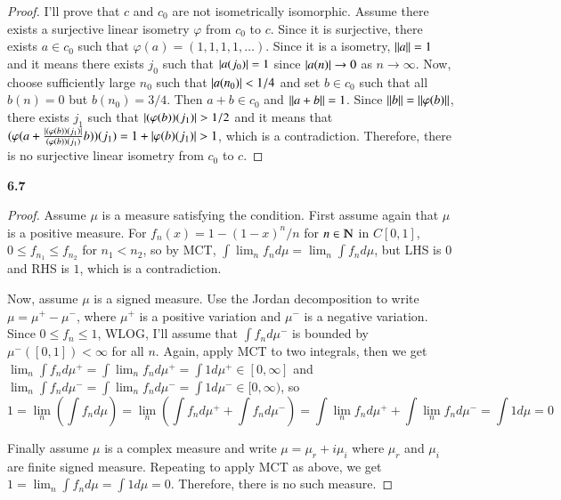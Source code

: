 \documentclass[a4paper, 12pt]{article}
\theoremstyle{Mydefinition}
\theoremstyle{Mytheorem}
\begin{document}
\begin{proof}
I'll prove that $c$ and $c_0$ are not isometrically isomorphic. Assume there exists a surjective linear isometry $\varphi$ from $c_0$ to $c$. Since it is surjective, there exists $a\in c_0$ such that $\varphi(a) = (1,1,1,1,\ldots)$. Since it is a isometry, $\norm{a} = 1$ and it means there exists $j_0$ such that $\abs{a(j_0)} = 1$ since $\abs{a(n)}\rightarrow 0$ as $n\rightarrow \infty$. Now, choose sufficiently large $n_0$ such that $\abs{a(n_0)}<1/4$ and set $b\in c_0$ such that all $b(n)=0$ but $b(n_0) = 3/4$. Then $a+b\in c_0$ and $\norm{a+b} = 1$. Since $\norm{b} = \norm{\varphi(b)}$, there exists $j_1$ such that $\abs{(\varphi(b))(j_1)}>1/2$ and it means that $(\varphi(a+\frac{\abs{(\varphi(b))(j_1)}}{(\varphi(b))(j_1)}b))(j_1) = 1 + \abs{\varphi(b)(j_1)} >1$, which is a contradiction. Therefore, there is no surjective linear isometry from $c_0$ to $c$.
\end{proof}

\noindent \textbf{6.7}
\begin{proof}
Assume $\mu$ is a measure satisfying the condition. First assume again that $\mu$ is a positive measure. For $f_n(x)=1-(1-x)^n/n$ for $n\in \varmathbb{N}$ in $C[0,1]$, $0\leq f_{n_1}\leq f_{n_2}$ for $n_1<n_2$, so by MCT, $\int \lim_n f_nd\mu = \lim_n \int f_nd\mu$, but LHS is $0$ and RHS is $1$, which is a contradiction.

Now, assume $\mu$ is a signed measure. Use the Jordan decomposition to write $\mu=\mu^+-\mu^-$, where $\mu^+$ is a positive variation and $\mu^-$ is a negative variation. Since $0\leq f_n\leq 1$, WLOG, I'll assume that $\int f_nd\mu^-$ is bounded by $\mu^-([0,1])<\infty$ for all $n$. Again, apply MCT to two integrals, then we get $\lim_n \int f_n d\mu^+ = \int \lim_n f_n d\mu^+ = \int 1 d\mu^+\in [0,\infty]$ and $\lim_n \int f_n d\mu^- = \int \lim_n f_n d\mu^- = \int 1 d\mu^-\in [0,\infty)$, so
\begin{equation}
    1=\lim_n\left(\int f_n d\mu\right) = \lim_n\left(\int f_n d\mu^+ + \int f_n d\mu^-\right) = \int\lim_n f_n d\mu^+ + \int\lim_n f_n d\mu^- = \int 1 d\mu = 0
\end{equation}

Finally assume $\mu$ is a complex measure and write $\mu=\mu_r+i\mu_i$ where $\mu_r$ and $\mu_i$ are finite signed measure. Repeating to apply MCT as above, we get $1 = \lim_n \int f_n d\mu = \int 1d\mu = 0$. Therefore, there is no such measure.
\end{proof}
\end{document}
